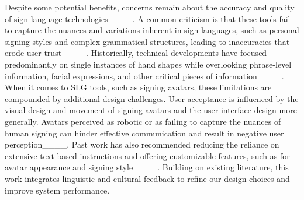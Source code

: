 Despite some potential benefits, concerns remain about the accuracy and quality of sign language technologies____. A common criticism is that these tools fail to capture the nuances and variations inherent in sign languages, such as personal signing styles and complex grammatical structures, leading to inaccuracies that erode user trust____. Historically, technical developments have focused predominantly on single instances of hand shapes while overlooking phrase-level information, facial expressions, and other critical pieces of information____. When it comes to SLG tools, such as signing avatars, these limitations are compounded by additional design challenges. User acceptance is influenced by the visual design and movement of signing avatars and the user interface design more generally. Avatars perceived as robotic or as failing to capture the nuances of human signing can hinder effective communication and result in negative user perception____. Past work has also recommended reducing the reliance on extensive text-based instructions and offering customizable features, such as for avatar appearance and signing style____. Building on existing literature, this work integrates linguistic and cultural feedback to refine our design choices and improve system performance.